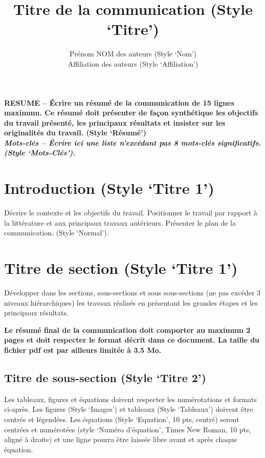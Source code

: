 \documentclass[a4paper,10pt,twocolumn]{article}
\title{
\fontsize{24pt}{24pt}\selectfont
Titre de la communication (Style ‘Titre’)
}
\author{
\fontsize{11pt}{11pt}\selectfont
Prénom NOM des auteurs (Style ‘Nom’)\\
\fontsize{10pt}{10pt}\selectfont
Affiliation des auteurs (Style ‘Affiliation’)
}
\date{}
\begin{document}
\maketitle
\thispagestyle{fancy}


\fontsize{9pt}{9pt}\selectfont
\textbf{RESUME -- Écrire un résumé de la communication de 15 lignes maximum. Ce résumé doit présenter de façon synthétique les objectifs du travail présenté, les principaux résultats et insister sur les originalités du travail. (Style ‘Résumé’)}\\

\textbf{\textit{Mots-clés -- Écrire ici une liste n’excédant pas 8 mots-clés significatifs. (Style ‘Mots-Clés’).}}

\fontsize{10pt}{10pt}\selectfont


\section{Introduction  (Style ‘Titre 1’)}

Décrire le contexte et les objectifs du travail. Positionner le travail par rapport à la littérature et aux principaux travaux antérieurs. Présenter le plan de la communication. (Style ‘Normal’).


\section{Titre de section (Style ‘Titre 1’)}

Développer dans les sections, sous-sections et sous sous-sections (ne pas excéder 3 niveaux hiérarchiques) les travaux réalisés en présentant les grandes étapes et les principaux résultats.

\textbf{Le résumé final de la communication doit comporter au maximum 2 pages et doit respecter le format décrit dans ce document. La taille du fichier pdf est par ailleurs limitée à 3.5 Mo.}


\subsection{Titre de sous-section (Style ‘Titre 2’)}

Les tableaux, figures et équations doivent respecter les numérotations et formats ci-après. Les figures (Style ‘Images’) et tableaux (Style ‘Tableaux’) doivent être centrés et légendées. Les équations (Style ‘Equation’, 10 pts, centré) seront centrées et numérotées (style ‘Numéro d’équation’, Times New Roman, 10 pts, aligné à droite) et une ligne pourra être laissée libre avant et après chaque équation.
\end{document}

